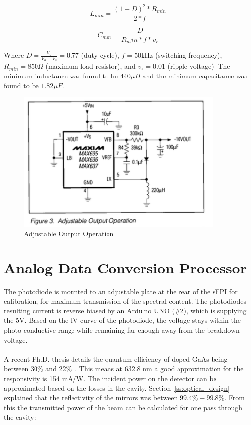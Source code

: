\documentclass[12pt,journal]{IEEEtran}
\begin{document}
\begin{equation}
L_{min} = \frac{(1-D)^2 * R_{min}}{2*f}
\label{eq:ipk}
\end{equation}

\begin{equation}
C_{min} = \frac{D}{R_min*f*v_r}
\label{eq:l}
\end{equation}

Where $D = \frac{V_o}{V_o + V_s} = 0.77$ (duty cycle), $f = 50\text{kHz}$ (switching frequency), $R_{min} = 850\Omega$ (maximum load resistor), and $v_r = 0.01$ (ripple voltage). The minimum inductance was found to be $440\mu H$ and the minimum capacitance was found to be $1.82\mu F$. 

\begin{figure}
	\centering
	\includegraphics[width=4in]{./max635.png}
	\caption{Adjustable Output Operation~\cite{MAX635}}
	\label{fig{max635}}
\end{figure}



\section{Analog Data Conversion Processor}\label{processor}

The photodiode is mounted to an adjustable plate at the rear of the sFPI for calibration, for maximum transmission of the spectral content. The photodiodes resulting current is reverse biased by an Arduino UNO (\#2), which is supplying the 5V. Based on the IV curve of the photodiode, the voltage stays within the photo-conductive range while remaining far enough away from the breakdown voltage. 
\\\\
A recent Ph.D. thesis details the quantum efficiency of doped GaAs being between 30\% and 22\%~\cite{responsivity}. This means at 632.8 nm a good approximation for the responsivity is 154 mA/W. The incident power on the detector can be approximated based on the losses in the cavity. Section~\ref{ss:optical_design} explained that the reflectivity of the mirrors was between $99.4\% - 99.8\%$. From this the transmitted power of the beam can be calculated for one pass through the cavity:
\end{document}
